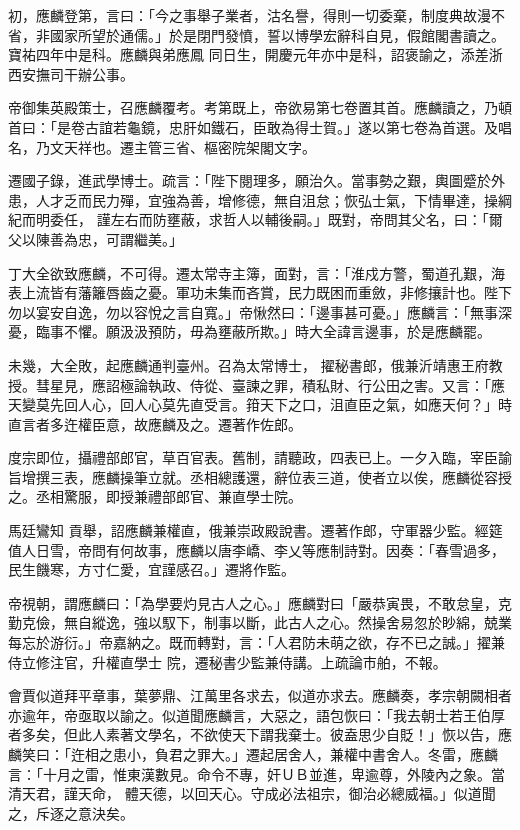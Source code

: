 \begin{pinyinscope}
 初，應麟登第，言曰：「今之事舉子業者，沽名譽，得則一切委棄，制度典故漫不省，非國家所望於通儒。」於是閉門發憤，誓以博學宏辭科自見，假館閣書讀之。寶祐四年中是科。應麟與弟應鳳
 同日生，開慶元年亦中是科，詔褒諭之，添差浙西安撫司干辦公事。



 帝御集英殿策士，召應麟覆考。考第既上，帝欲易第七卷置其首。應麟讀之，乃頓首曰：「是卷古誼若龜鏡，忠肝如鐵石，臣敢為得士賀。」遂以第七卷為首選。及唱名，乃文天祥也。遷主管三省、樞密院架閣文字。



 遷國子錄，進武學博士。疏言：「陛下閱理多，願治久。當事勢之艱，輿圖蹙於外患，人才乏而民力殫，宜強為善，增修德，無自沮怠；恢弘士氣，下情畢達，操綱紀而明委任，
 謹左右而防壅蔽，求哲人以輔後嗣。」既對，帝問其父名，曰：「爾父以陳善為忠，可謂繼美。」



 丁大全欲致應麟，不可得。遷太常寺主簿，面對，言：「淮戍方警，蜀道孔艱，海表上流皆有藩籬唇齒之憂。軍功未集而吝賞，民力既困而重斂，非修攘計也。陛下勿以宴安自逸，勿以容悅之言自寬。」帝愀然曰：「邊事甚可憂。」應麟言：「無事深憂，臨事不懼。願汲汲預防，毋為壅蔽所欺。」時大全諱言邊事，於是應麟罷。



 未幾，大全敗，起應麟通判臺州。召為太常博士，
 擢秘書郎，俄兼沂靖惠王府教授。彗星見，應詔極論執政、侍從、臺諫之罪，積私財、行公田之害。又言：「應天變莫先回人心，回人心莫先直受言。箝天下之口，沮直臣之氣，如應天何？」時直言者多迕權臣意，故應麟及之。遷著作佐郎。



 度宗即位，攝禮部郎官，草百官表。舊制，請聽政，四表已上。一夕入臨，宰臣諭旨增撰三表，應麟操筆立就。丞相總護還，辭位表三道，使者立以俟，應麟從容授之。丞相驚服，即授兼禮部郎官、兼直學士院。



 馬廷鸞知
 貢舉，詔應麟兼權直，俄兼崇政殿說書。遷著作郎，守軍器少監。經筵值人日雪，帝問有何故事，應麟以唐李嶠、李乂等應制詩對。因奏：「春雪過多，民生饑寒，方寸仁愛，宜謹感召。」遷將作監。



 帝視朝，謂應麟曰：「為學要灼見古人之心。」應麟對曰「嚴恭寅畏，不敢怠皇，克勤克儉，無自縱逸，強以馭下，制事以斷，此古人之心。然操舍易忽於眇綿，兢業每忘於游衍。」帝嘉納之。既而轉對，言：「人君防未萌之欲，存不已之誠。」擢兼侍立修注官，升權直學士
 院，遷秘書少監兼侍講。上疏論市舶，不報。



 會賈似道拜平章事，葉夢鼎、江萬里各求去，似道亦求去。應麟奏，孝宗朝闕相者亦逾年，帝亟取以諭之。似道聞應麟言，大惡之，語包恢曰：「我去朝士若王伯厚者多矣，但此人素著文學名，不欲使天下謂我棄士。彼盍思少自貶！」恢以告，應麟笑曰：「迕相之患小，負君之罪大。」遷起居舍人，兼權中書舍人。冬雷，應麟言：「十月之雷，惟東漢數見。命令不專，奸ＵＢ並進，卑逾尊，外陵內之象。當清天君，謹天命，
 體天德，以回天心。守成必法祖宗，御治必總威福。」似道聞之，斥逐之意決矣。




\end{pinyinscope}

